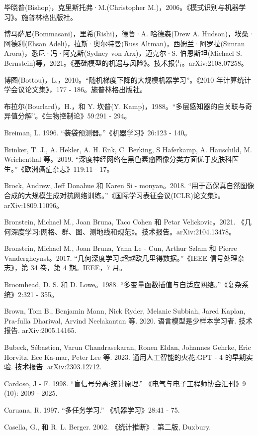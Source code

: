 \documentclass[10pt]{article}
\begin{document}
毕晓普(Bishop)，克里斯托弗·M.(Christopher M.)，2006。《模式识别与机器学习》。施普林格出版社。

博马萨尼(Bommasani)，里希(Rishi)，德鲁·A. 哈德森(Drew A. Hudson)，埃桑·阿德利(Ehsan Adeli)，拉斯·奥尔特曼(Russ Altman)，西姆兰·阿罗拉(Simran Arora)，悉尼·冯·阿克斯(Sydney von Arx)，迈克尔·S. 伯恩斯坦(Michael S. Bernstein)等，2021。《基础模型的机遇与风险》。技术报告。arXiv:2108.07258。

博图(Bottou)，L.，2010。“随机梯度下降的大规模机器学习”。《2010 年计算统计学会议论文集》，177 - 186。施普林格出版社。

布拉尔(Bourlard)，H.，和 Y. 坎普(Y. Kamp)，1988。“多层感知器的自关联与奇异值分解”。《生物控制论》59:291 - 294。

Breiman, L. 1996. “装袋预测器。”《机器学习》26:123 - 140。

Brinker, T. J., A. Hekler, A. H. Enk, C. Berking, S Haferkamp, A. Hauschild, M. Weichenthal 等。2019. “深度神经网络在黑色素瘤图像分类方面优于皮肤科医生。”《欧洲癌症杂志》119:11 - 17。

Brock, Andrew, Jeff Donahue 和 Karen Si - monyan。2018. “用于高保真自然图像合成的大规模生成对抗网络训练。”《国际学习表征会议(ICLR)论文集》。arXiv:1809.11096。

Bronstein, Michael M., Joan Bruna, Taco Cohen 和 Petar Velickovic。2021. 《几何深度学习:网格、群、图、测地线和规范》。技术报告。arXiv:2104.13478。

Bronstein, Michael M., Joan Bruna, Yann Le - Cun, Arthur Szlam 和 Pierre Vandergheynst。2017. “几何深度学习:超越欧几里得数据。”《IEEE 信号处理杂志》，第 34 卷，第 4 期。IEEE，7 月。

Broomhead, D. S. 和 D. Lowe。1988. “多变量函数插值与自适应网络。”《复杂系统》2:321 - 355。

Brown, Tom B., Benjamin Mann, Nick Ryder, Melanie Subbiah, Jared Kaplan, Pra-fulla Dhariwal, Arvind Neelakantan 等. 2020. 语言模型是少样本学习者. 技术报告. arXiv:2005.14165.

Bubeck, Sébastien, Varun Chandrasekaran, Ronen Eldan, Johannes Gehrke, Eric Horvitz, Ece Ka-mar, Peter Lee 等. 2023. 通用人工智能的火花:GPT - 4 的早期实验. 技术报告. arXiv:2303.12712.

Cardoso, J - F. 1998. “盲信号分离:统计原理.” 《电气与电子工程师协会汇刊》9 (10): 2009 - 2025.

Caruana, R. 1997. “多任务学习.” 《机器学习》28:41 - 75.

Casella, G., 和 R. L. Berger. 2002. 《统计推断》. 第二版, Duxbury.
\end{document}
